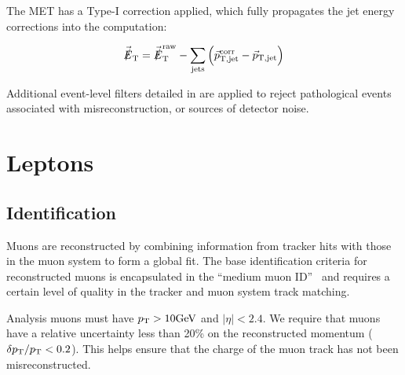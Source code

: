 The MET has a Type-I correction applied, which fully propagates
the jet energy corrections into the computation:

\begin{equation}
    \vec{\slashed{E}}_\mathrm{T}
    = \vec{\slashed{E}}_\mathrm{T}^\mathrm{raw}
    - \sum_{\mathrm{jets}} \left( 
        \vec{p}_\mathrm{T,jet}^\text{corr} 
        - \vec{p}_\mathrm{T,jet}
    \right)
\end{equation}

Additional event-level filters detailed in \cite{CMS:JetMETFilters} are applied 
to reject pathological events associated with misreconstruction, or sources of 
detector noise.

\section{Leptons}

\subsection{Identification}

Muons are reconstructed by combining information from tracker hits
with those in the muon system to form a global fit.
The base identification criteria for reconstructed muons is encapsulated in the 
``medium muon ID''~\cite{CMS:Sirunyan2019yvv} and requires
a certain level of quality in the tracker and muon system track matching.

Analysis muons must have $p_{\mathrm{T}}>10\text{GeV}$ and $|\eta|<2.4$. 
We require that muons have a relative 
uncertainty less than 20\% on the reconstructed momentum ($\delta p_{\mathrm{T}}/p_{\mathrm{T}}<0.2$).
This helps ensure that the charge of the muon track has not been misreconstructed.


